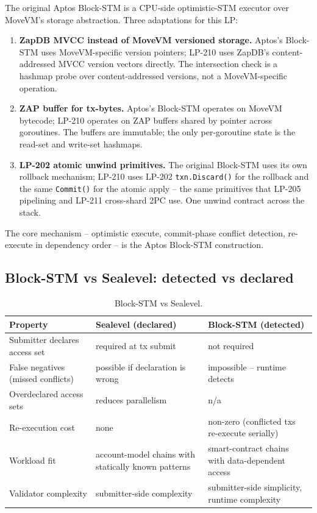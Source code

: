 The original Aptos Block-STM \cite{blockstm2022} is a CPU-side
optimistic-STM executor over MoveVM's storage abstraction. Three
adaptations for this LP:

\begin{enumerate}[leftmargin=2em,nosep]
\item \textbf{ZapDB MVCC instead of MoveVM versioned storage.}
  Aptos's Block-STM uses MoveVM-specific version pointers; LP-210
  uses ZapDB's content-addressed MVCC version vectors directly. The
  intersection check is a hashmap probe over content-addressed
  versions, not a MoveVM-specific operation.
\item \textbf{ZAP buffer for tx-bytes.} Aptos's Block-STM operates
  on MoveVM bytecode; LP-210 operates on ZAP buffers shared by
  pointer across goroutines. The buffers are immutable; the only
  per-goroutine state is the read-set and write-set hashmaps.
\item \textbf{LP-202 atomic unwind primitives.} The original
  Block-STM uses its own rollback mechanism; LP-210 uses LP-202
  \texttt{txn.Discard()} for the rollback and the same \texttt{Commit()}
  for the atomic apply -- the same primitives that LP-205 pipelining
  and LP-211 cross-shard 2PC use. One unwind contract across the
  stack.
\end{enumerate}

The core mechanism -- optimistic execute, commit-phase conflict
detection, re-execute in dependency order -- is the Aptos Block-STM
construction.

\subsection{Block-STM vs Sealevel: detected vs declared}

\begin{table}[h]
\centering
\small
\begin{tabular}{@{}p{3.5cm}p{4cm}p{4cm}@{}}
\toprule
\textbf{Property} & \textbf{Sealevel (declared)} & \textbf{Block-STM (detected)} \\
\midrule
Submitter declares access set & required at tx submit & not required \\
False negatives (missed conflicts) & possible if declaration is wrong & impossible -- runtime detects \\
Overdeclared access sets & reduces parallelism & n/a \\
Re-execution cost & none & non-zero (conflicted txs re-execute serially) \\
Workload fit & account-model chains with statically known patterns & smart-contract chains with data-dependent access \\
Validator complexity & submitter-side complexity & submitter-side simplicity, runtime complexity \\
\bottomrule
\end{tabular}
\caption{Block-STM vs Sealevel.}
\label{tab:vs-sealevel}
\end{table}


